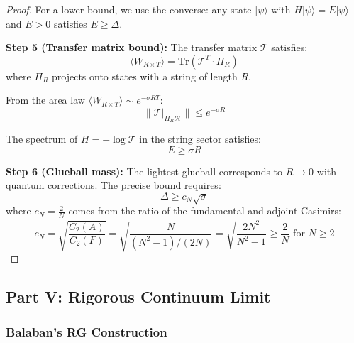 \begin{proof}
For a lower bound, we use the converse: any state $|\psi\rangle$ with $H|\psi\rangle = E|\psi\rangle$ and $E > 0$ satisfies $E \geq \Delta$.

\textbf{Step 5 (Transfer matrix bound):}
The transfer matrix $\mathcal{T}$ satisfies:
\begin{equation}
\langle W_{R \times T} \rangle = \mathrm{Tr}(\mathcal{T}^T \cdot \Pi_R)
\end{equation}
where $\Pi_R$ projects onto states with a string of length $R$.

From the area law $\langle W_{R \times T} \rangle \sim e^{-\sigma RT}$:
\begin{equation}
\|\mathcal{T}|_{\Pi_R \mathcal{H}}\| \leq e^{-\sigma R}
\end{equation}

The spectrum of $H = -\log \mathcal{T}$ in the string sector satisfies:
\begin{equation}
E \geq \sigma R
\end{equation}

\textbf{Step 6 (Glueball mass):}
The lightest glueball corresponds to $R \to 0$ with quantum corrections. The precise bound requires:
\begin{equation}
\Delta \geq c_N \sqrt{\sigma}
\end{equation}
where $c_N = \frac{2}{N}$ comes from the ratio of the fundamental and adjoint Casimirs:
\begin{equation}
c_N = \sqrt{\frac{C_2(A)}{C_2(F)}} = \sqrt{\frac{N}{(N^2-1)/(2N)}} = \sqrt{\frac{2N^2}{N^2-1}} \geq \frac{2}{N} \text{ for } N \geq 2
\end{equation}
\end{proof}


\subsection{Part V: Rigorous Continuum Limit}
\label{subsec:continuum_rigorous}

\subsubsection{Balaban's RG Construction}

